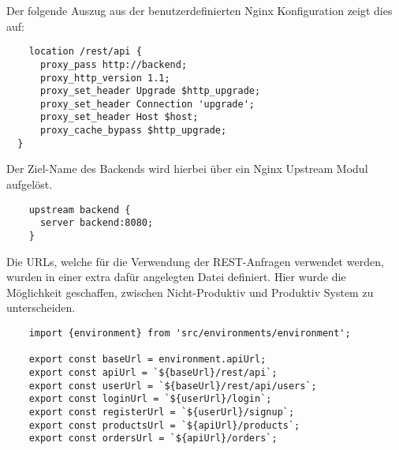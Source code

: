 Der folgende Auszug aus der benutzerdefinierten Nginx Konfiguration zeigt dies auf:

\begin{verbatim}
	location /rest/api {
      proxy_pass http://backend;
      proxy_http_version 1.1;
      proxy_set_header Upgrade $http_upgrade;
      proxy_set_header Connection 'upgrade';
      proxy_set_header Host $host;
      proxy_cache_bypass $http_upgrade;
  }
\end{verbatim}

Der Ziel-Name des Backends wird hierbei über ein Nginx Upstream Modul aufgelöst.

\begin{verbatim}
	upstream backend {
	  server backend:8080;
	}
\end{verbatim}
\newpage
Die URLs, welche für die Verwendung der REST-Anfragen verwendet werden, wurden in einer extra dafür angelegten Datei definiert. Hier wurde die Möglichkeit geschaffen, zwischen Nicht-Produktiv und Produktiv System zu unterscheiden.

\begin{verbatim}
	import {environment} from 'src/environments/environment';

	export const baseUrl = environment.apiUrl;
	export const apiUrl = `${baseUrl}/rest/api`;
	export const userUrl = `${baseUrl}/rest/api/users`;
	export const loginUrl = `${userUrl}/login`;
	export const registerUrl = `${userUrl}/signup`;
	export const productsUrl = `${apiUrl}/products`;
	export const ordersUrl = `${apiUrl}/orders`;

\end{verbatim}